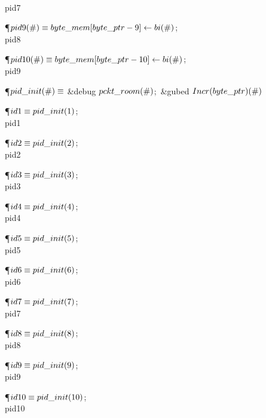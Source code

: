 \\{pid7}\par
\P\D {}$\\{pid9}(\#)\S\\{byte\_mem}[\\{byte\_ptr}-9]\K\\{bi}(\#)$;\5
\\{pid8}\par
\P\D {}$\\{pid10}(\#)\S\\{byte\_mem}[\\{byte\_ptr}-10]\K\\{bi}(\#)$;\5
\\{pid9}\Y\par
\P\D {}$\\{pid\_init}(\#)\S$\1\6
\&{debug} $\\{pckt\_room}(\#)$;\ \&{gubed}\2\6
$\\{Incr}(\\{byte\_ptr})(\#)$\Y\par
\P\D {}$\\{id1}\S\\{pid\_init}(1)$;\5
\\{pid1}\par
\P\D {}$\\{id2}\S\\{pid\_init}(2)$;\5
\\{pid2}\par
\P\D {}$\\{id3}\S\\{pid\_init}(3)$;\5
\\{pid3}\par
\P\D {}$\\{id4}\S\\{pid\_init}(4)$;\5
\\{pid4}\par
\P\D {}$\\{id5}\S\\{pid\_init}(5)$;\5
\\{pid5}\par
\P\D {}$\\{id6}\S\\{pid\_init}(6)$;\5
\\{pid6}\par
\P\D {}$\\{id7}\S\\{pid\_init}(7)$;\5
\\{pid7}\par
\P\D {}$\\{id8}\S\\{pid\_init}(8)$;\5
\\{pid8}\par
\P\D {}$\\{id9}\S\\{pid\_init}(9)$;\5
\\{pid9}\par
\P\D {}$\\{id10}\S\\{pid\_init}(10)$;\5
\\{pid10}\par
\fi


